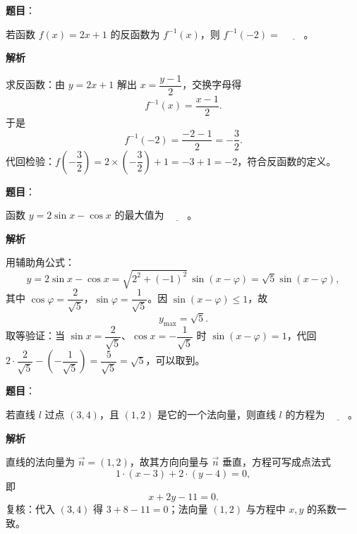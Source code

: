 \begin{answer}

\textbf{题目}：

若函数 $f(x)=2x+1$ 的反函数为 $f^{-1}(x)$，则 $f^{-1}(-2)=$ $\underline{\qquad}$。

\textbf{解析}

求反函数：由 $y=2x+1$ 解出 $x=\dfrac{y-1}{2}$，交换字母得
\nopagebreak[4]
\[f^{-1}(x)=\frac{x-1}{2}.\]
于是
\nopagebreak[4]
\[f^{-1}(-2)=\frac{-2-1}{2}=-\frac32.\]
代回检验：$f\left(-\dfrac32\right)=2\times\left(-\dfrac32\right)+1=-3+1=-2$，符合反函数的定义。


\end{answer}
\begin{answer}

\textbf{题目}：

函数 $y=2\sin x-\cos x$ 的最大值为 $\underline{\qquad}$。

\textbf{解析}

用辅助角公式：
\nopagebreak[4]
\[y=2\sin x-\cos x=\sqrt{2^2+(-1)^2}\,\sin(x-\varphi)=\sqrt5\sin(x-\varphi),\]
其中 $\cos\varphi=\dfrac2{\sqrt5}$，$\sin\varphi=\dfrac1{\sqrt5}$。因 $\sin(x-\varphi)\leqslant1$，故
\nopagebreak[4]
\[y_{\max}=\sqrt5.\]
取等验证：当 $\sin x=\dfrac2{\sqrt5}$、$\cos x=-\dfrac1{\sqrt5}$ 时 $\sin(x-\varphi)=1$，代回 $2\cdot\dfrac2{\sqrt5}-\left(-\dfrac1{\sqrt5}\right)=\dfrac5{\sqrt5}=\sqrt5$，可以取到。


\end{answer}
\begin{answer}

\textbf{题目}：

若直线 $l$ 过点 $(3,4)$，且 $(1,2)$ 是它的一个法向量，则直线 $l$ 的方程为 $\underline{\qquad}$。

\textbf{解析}

直线的法向量为 $\vec n=(1,2)$，故其方向向量与 $\vec n$ 垂直，方程可写成点法式
\nopagebreak[4]
\[1\cdot(x-3)+2\cdot(y-4)=0,\]
即
\nopagebreak[4]
\[x+2y-11=0.\]
复核：代入 $(3,4)$ 得 $3+8-11=0$；法向量 $(1,2)$ 与方程中 $x,y$ 的系数一致。


\end{answer}
